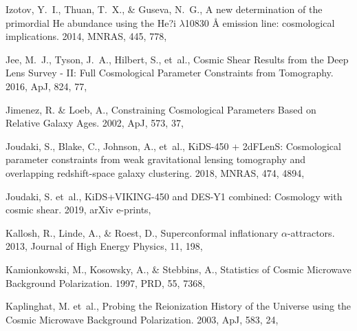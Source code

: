\documentclass[longauth,traditabstract]{aa}
\def\apj{{ApJ}}
\def\mnras{{MNRAS}}
\def\prd{{PRD}}
\begin{document}
\begin{thebibliography}{379}
Izotov, Y.~I., Thuan, T.~X., \& Guseva, N.~G., {A new determination of the
  primordial He abundance using the He?i $\lambda$10830 Å emission line:
  cosmological implications}. 2014, \mnras, 445, 778, 

Jee, M.~J., Tyson, J.~A., Hilbert, S., {et~al.}, {Cosmic Shear Results from the
  Deep Lens Survey - II: Full Cosmological Parameter Constraints from
  Tomography}. 2016, \apj, 824, 77, 

{Jimenez}, R. \& {Loeb}, A., {Constraining Cosmological Parameters Based on
  Relative Galaxy Ages}. 2002, \apj, 573, 37, 

{Joudaki}, S., {Blake}, C., {Johnson}, A., {et~al.}, {KiDS-450 + 2dFLenS:
  Cosmological parameter constraints from weak gravitational lensing tomography
  and overlapping redshift-space galaxy clustering}. 2018, \mnras, 474, 4894,

Joudaki, S. {et~al.}, {KiDS+VIKING-450 and DES-Y1 combined: Cosmology with
  cosmic shear}. 2019, arXiv e-prints, 

{Kallosh}, R., {Linde}, A., \& {Roest}, D., {Superconformal inflationary
  {$\alpha$}-attractors}. 2013, Journal of High Energy Physics, 11, 198,

Kamionkowski, M., Kosowsky, A., \& Stebbins, A., Statistics of Cosmic Microwave
  Background Polarization. 1997, \prd, 55, 7368, 

Kaplinghat, M. {et~al.}, Probing the Reionization History of the Universe using
  the Cosmic Microwave Background Polarization. 2003, \apj, 583, 24,


\end{thebibliography}
\end{document}
